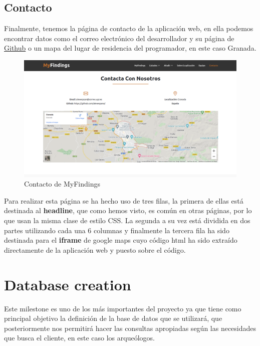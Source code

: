     \subsection{Contacto}
    Finalmente, tenemos la página de contacto de la aplicación web, en ella podemos
    encontrar datos como el correo electrónico del desarrollador y su página de
    \href{https://github.com/alexespana/}{Github} o un mapa del lugar de residencia del
    programador, en este caso Granada.\\

        \begin{figure}[H]
            \centering
            \includegraphics[scale=0.25]{imagenes/contact.png}
            \caption{Contacto de MyFindings}
            \label{fig:contact}
        \end{figure}

    Para realizar esta página se ha hecho uso de tres filas, la primera de ellas
    está destinada al \textbf{headline}, que como hemos visto, es común en otras páginas, 
    por lo que usan la misma clase de estilo CSS. La segunda a su vez está dividida en 
    dos partes utilizando cada una 6 columnas y finalmente la tercera fila ha sido
    destinada para el \textbf{iframe} de google maps cuyo código html ha sido extraído
    directamente de la aplicación web y puesto sobre el código.

\section{Database creation}
Este milestone es uno de los más importantes del proyecto ya que tiene como principal objetivo
la definición de la base de datos que se utilizará, que posteriormente nos permitirá hacer las
consultas apropiadas según las necesidades que busca el cliente, en este caso los arqueólogos.\\

